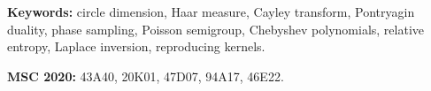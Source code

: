 \documentclass[12pt,a4paper]{article}
\theoremstyle{plain}
\theoremstyle{definition}
\numberwithin{equation}{section}
\begin{document}
\smallskip
\noindent\textbf{Keywords:}
circle dimension, Haar measure, Cayley transform, Pontryagin duality,
phase sampling, Poisson semigroup, Chebyshev polynomials,
relative entropy, Laplace inversion, reproducing kernels.

\smallskip
\noindent\textbf{MSC 2020:}
43A40, 20K01, 47D07, 94A17, 46E22.







\appendix




\end{document}
